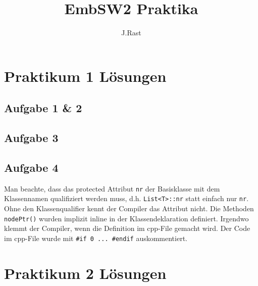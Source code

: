 \documentclass{scrartcl}
\title{EmbSW2 Praktika}
\author{J.Rast}
\newcommand{\basepath}{praktika/}
\begin{document}

\section{Praktikum 1 Lösungen}
\subsection{Aufgabe 1 \& 2}





\subsection{Aufgabe 3}







\subsection{Aufgabe 4}
Man beachte, dass das protected Attribut \lstinline!nr! der Basisklasse mit dem Klassennamen qualifiziert werden
muss, d.h. \lstinline!List<T>::nr! statt einfach nur \lstinline!nr!. Ohne den Klassenqualifier kennt der Compiler das Attribut
nicht.
Die Methoden \lstinline!nodePtr()! wurden implizit inline in der Klassendeklaration definiert. Irgendwo klemmt der
Compiler, wenn die Definition im cpp-File gemacht wird. Der Code im cpp-File wurde mit \lstinline!#if 0 ... #endif!
auskommentiert.









\section{Praktikum 2 Lösungen}
\end{document}
